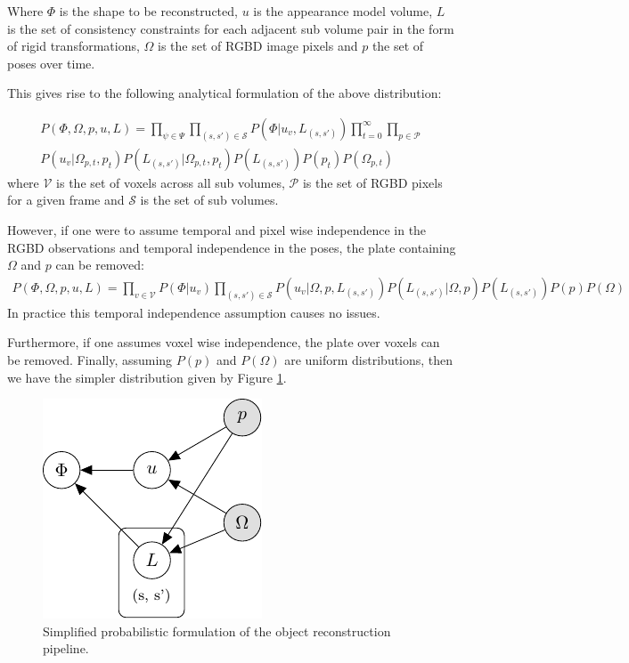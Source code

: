 Where $\Phi$ is the shape to be reconstructed, $u$ is the appearance model volume, $L$ is the 
set of consistency constraints for each adjacent sub volume pair in the form of rigid transformations, $\Omega$ is the set of 
RGBD image pixels and $p$ the set of poses over time.

This gives rise to the following analytical formulation of the above distribution:

\begin{equation}
\begin{split}
P(\Phi, \Omega, p, u, L) = 
\prod_{\psi \in \Psi}\prod_{(s, s') \in \mathcal{S}}P(\Phi|u_{v}, L_{(s, s')}) 
\prod_{t=0}^{\infty}\prod_{p \in \mathcal{P}}\\
P(u_{v}|\Omega_{p, t}, p_{t})
P(L_{(s, s')}|\Omega_{p, t}, p_{t})
P(L_{(s, s')})P(p_{t})P(\Omega_{p, t})
\end{split}
\end{equation}
where $\mathcal{V}$ is the set of voxels across all sub volumes, $\mathcal{P}$ is the set of RGBD pixels for a given 
frame and $\mathcal{S}$ is the set of sub volumes.

However, if one were to assume temporal and pixel wise independence in the RGBD observations and temporal independence in 
the poses, the plate containing $\Omega$ and $p$ can be removed:
\begin{equation}
\begin{split}
P(\Phi, \Omega, p, u, L) = 
\prod_{v \in \mathcal{V}}P(\Phi|u_{v})
\prod_{(s, s') \in \mathcal{S}}P(u_{v}|\Omega, p, L_{(s, s')})
P(L_{(s, s')}|\Omega, p) P(L_{(s, s')})P(p)P(\Omega)
\end{split}
\end{equation}
In practice this temporal independence assumption causes no issues.

Furthermore, if one assumes voxel wise independence, the plate over voxels can be removed. Finally, assuming $P(p)$ and 
$P(\Omega)$ are uniform distributions, then we have the simpler distribution given by Figure \ref{pgm2}.
\begin{figure}[h]
	\centering
	\includegraphics{graphical_models/pgm2.pdf}
	\caption{Simplified probabilistic formulation of the object reconstruction pipeline.}
	\label{pgm2}
\end{figure}


